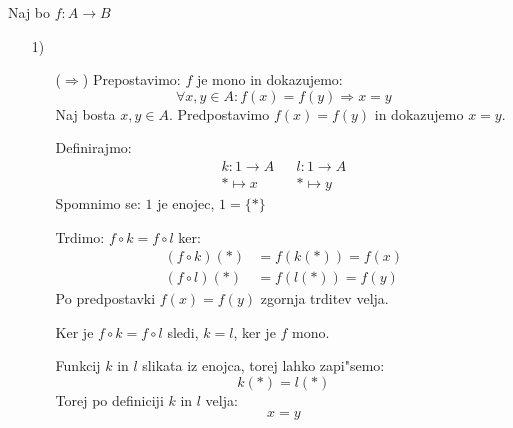 Naj bo $f: A \to B$
\begin{enumerate}
	\item[1)] 
	\begin{itemize}
		\item[($\Rightarrow$)] Prepostavimo: $f$ je mono in dokazujemo:
		\begin{equation*}
		\forall x, y \in A: f(x) = f(y) \Rightarrow x = y
		\end{equation*}
		Naj bosta $x, y \in A$. Predpostavimo $f(x) = f(y)$ in dokazujemo $x = y$.
		
		Definirajmo:
		\begin{align*}
		k: 1 \to A && l: 1 \to A \\
		* \mapsto x && * \mapsto y
		\end{align*}
		Spomnimo se: $1$ je enojec, $1 = \{*\}$
		
		Trdimo: $f \circ k = f \circ l$ ker:
		\begin{align*}
		(f \circ k)(*) &= f(k(*)) = f(x) \\
		(f \circ l)(*) &= f(l(*)) = f(y)
		\end{align*}
		Po predpostavki $f(x) = f(y)$ zgornja trditev velja.
		
		Ker je $f \circ k = f \circ l$ sledi, $k = l$, ker je $f$ mono.
		
		Funkcij $k$ in $l$ slikata iz enojca, torej lahko zapi"semo:
		\begin{equation*}
		k(*) = l(*)
		\end{equation*}
		Torej po definiciji $k$ in $l$ velja:
		\begin{equation*}
		x = y
		\end{equation*}
	\end{itemize}
\end{enumerate}

